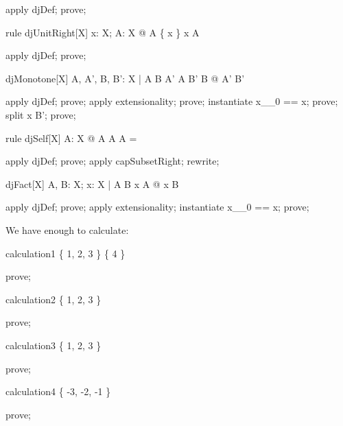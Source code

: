 \documentclass{article}
\begin{document}
\begin{zproof}
apply djDef;
prove;
\end{zproof}


\begin{theorem}{rule djUnitRight}[X]
  \forall x: X; A: \power X @ 
    A \dj \{ x \} \iff \lnot x \in A
\end{theorem}

\begin{zproof}
apply djDef;
prove;
\end{zproof}

\begin{theorem}{djMonotone}[X]
  \forall A, A', B, B': \power X
        | A \dj B \land A' \subseteq A \land B' \subseteq B
        @ A' \dj B'
\end{theorem}

\begin{zproof}
apply djDef;
prove;
apply extensionality;
prove;
instantiate x\_\_0 == x;
prove;
split x \in B';
prove;
\end{zproof}


\begin{theorem}{rule djSelf}[X]
  \forall A: \power X @ A \dj A \iff A = \emptyset
\end{theorem}

\begin{zproof}
apply djDef;
prove;
apply capSubsetRight;
rewrite;
\end{zproof}


\begin{theorem}{djFact}[X]
  \forall A, B: \power X; x: X
        | A \dj B \land x \in A
        @ \lnot x \in B
\end{theorem}

\begin{zproof}
apply djDef;
prove;
apply extensionality;
instantiate x\_\_0 == x;
prove;
\end{zproof}

We have enough to calculate:

\begin{theorem}{calculation1}
  \{ 1, 2, 3 \} \dj \{ 4 \}
\end{theorem}

\begin{zproof}
prove;
\end{zproof}

\begin{theorem}{calculation2}
  \{ 1, 2, 3 \}  
\end{theorem}

\begin{zproof}
prove;
\end{zproof}

\begin{theorem}{calculation3}
 \lnot \{ 1, 2, 3 \}  
\end{theorem}

\begin{zproof}
prove;
\end{zproof}

\begin{theorem}{calculation4}
 \nat \dj \{ -3, -2, -1 \}
\end{theorem}

\begin{zproof}
prove;
\end{zproof}
\end{document}
